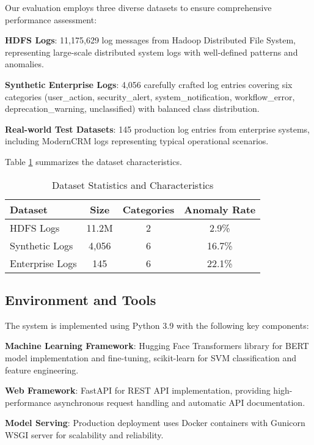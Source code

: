 \documentclass[conference]{IEEEtran}
\begin{document}
Our evaluation employs three diverse datasets to ensure comprehensive performance assessment:

\textbf{HDFS Logs}: 11,175,629 log messages from Hadoop Distributed File System, representing large-scale distributed system logs with well-defined patterns and anomalies.

\textbf{Synthetic Enterprise Logs}: 4,056 carefully crafted log entries covering six categories (user\_action, security\_alert, system\_notification, workflow\_error, deprecation\_warning, unclassified) with balanced class distribution.

\textbf{Real-world Test Datasets}: 145 production log entries from enterprise systems, including ModernCRM logs representing typical operational scenarios.

Table \ref{tab:dataset_stats} summarizes the dataset characteristics.

\begin{table}[htbp]
\caption{Dataset Statistics and Characteristics}
\begin{center}
\begin{tabular}{|l|c|c|c|}
\hline
\textbf{Dataset} & \textbf{Size} & \textbf{Categories} & \textbf{Anomaly Rate} \\
\hline
HDFS Logs & 11.2M & 2 & 2.9\% \\
\hline
Synthetic Logs & 4,056 & 6 & 16.7\% \\
\hline
Enterprise Logs & 145 & 6 & 22.1\% \\
\hline
\end{tabular}
\label{tab:dataset_stats}
\end{center}
\end{table}

\subsection{Environment and Tools}

The system is implemented using Python 3.9 with the following key components:

\textbf{Machine Learning Framework}: Hugging Face Transformers library for BERT model implementation and fine-tuning, scikit-learn for SVM classification and feature engineering.

\textbf{Web Framework}: FastAPI for REST API implementation, providing high-performance asynchronous request handling and automatic API documentation.

\textbf{Model Serving}: Production deployment uses Docker containers with Gunicorn WSGI server for scalability and reliability.
\end{document}
